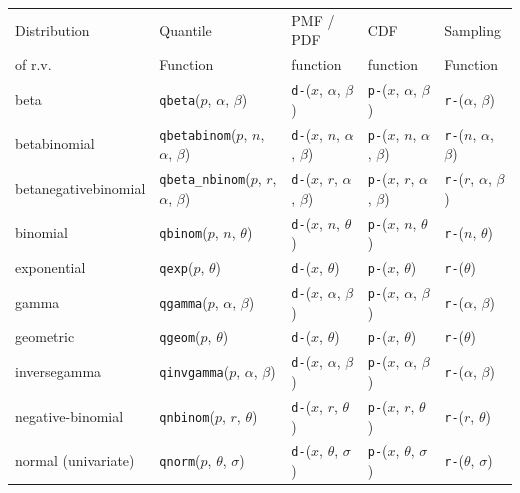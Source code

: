 \documentclass[12pt]{article}
\begin{document}
\pagebreak
\begin{table}[htp]
\centering
\small
\begin{tabular}{l | llll}
Distribution                  & Quantile  & PMF / PDF  &CDF       & Sampling  \\ 
of r.v. &  Function & function         & function &  Function \\ \hline
beta & \texttt{qbeta}($p$, $\alpha$, $\beta$)             
& \texttt{d-}($x$, $\alpha$, $\beta$)
& \texttt{p-}($x$, $\alpha$, $\beta$) 
& \texttt{r-}($\alpha$, $\beta$) \\
betabinomial & \texttt{qbetabinom}($p$, $n$, $\alpha$, $\beta$)              
& \texttt{d-}($x$, $n$, $\alpha$, $\beta$)
& \texttt{p-}($x$, $n$, $\alpha$, $\beta$) 
& \texttt{r-}($n$, $\alpha$, $\beta$) \\

betanegativebinomial & \texttt{qbeta\_nbinom}($p$, $r$, $\alpha$, $\beta$) 
& \texttt{d-}($x$, $r$, $\alpha$, $\beta$)
& \texttt{p-}($x$, $r$, $\alpha$, $\beta$) 
& \texttt{r-}($r$, $\alpha$, $\beta$) \\

binomial & \texttt{qbinom}($p$, $n$, $\theta$) 
& \texttt{d-}($x$, $n$, $\theta$)
& \texttt{p-}($x$, $n$, $\theta$) 
& \texttt{r-}($n$, $\theta$) \\

exponential & \texttt{qexp}($p$, $\theta$) 
& \texttt{d-}($x$, $\theta$) 
& \texttt{p-}($x$, $\theta$) 
& \texttt{r-}($\theta$) \\

gamma & \texttt{qgamma}($p$, $\alpha$, $\beta$) 
& \texttt{d-}($x$, $\alpha$, $\beta$)
& \texttt{p-}($x$, $\alpha$, $\beta$) 
& \texttt{r-}($\alpha$, $\beta$) \\

geometric & \texttt{qgeom}($p$, $\theta$) 
& \texttt{d-}($x$, $\theta$)
& \texttt{p-}($x$, $\theta$) 
& \texttt{r-}($\theta$) \\

inversegamma & \texttt{qinvgamma}($p$, $\alpha$, $\beta$) 
& \texttt{d-}($x$, $\alpha$, $\beta$)
& \texttt{p-}($x$, $\alpha$, $\beta$) 
& \texttt{r-}($\alpha$, $\beta$) \\

negative-binomial & \texttt{qnbinom}($p$, $r$, $\theta$) 
& \texttt{d-}($x$, $r$, $\theta$) 
& \texttt{p-}($x$, $r$, $\theta$) 
& \texttt{r-}($r$, $\theta$) \\

normal (univariate) & \texttt{qnorm}($p$, $\theta$, $\sigma$) 
& \texttt{d-}($x$, $\theta$, $\sigma$)
& \texttt{p-}($x$, $\theta$, $\sigma$) 
& \texttt{r-}($\theta$, $\sigma$) \\


\end{tabular}
\end{table}
\end{document}
